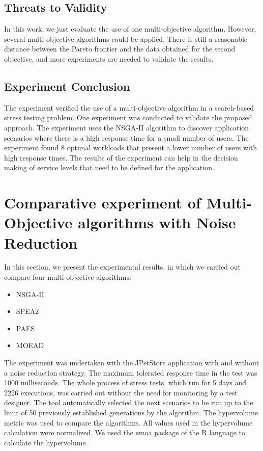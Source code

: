 \documentclass[espaco=umemeio,chapter=TITLE,twoside,openright]{abnt}
\begin{document}
\subsection{Threats to Validity}

In this work, we just evaluate the use of one multi-objective algorithm. However, several multi-objective algorithms could be applied.  There is still a reasonable distance between the Pareto frontier and the data obtained for the second objective, and more experiments are needed to validate the results.

\subsection{Experiment Conclusion}


The experiment verified the use of a multi-objective algorithm in a search-based stress testing problem. One experiment was conducted to validate the proposed approach. The experiment uses the NSGA-II algorithm to discover application scenarios where there is a high response time for a small number of users. The experiment found 8 optimal workloads that present a lower number of users with high response times. The results of the experiment can help in the decision making of service levels that need to be defined for the application.

\section{Comparative experiment of Multi-Objective algorithms with Noise Reduction}


In this section, we present the experimental results, in which we carried out compare four multi-objective algorithms:

\begin{itemize}
\item NSGA-II
\item SPEA2
\item PAES
\item MOEAD
\end{itemize}

The experiment was undertaken with the JPetStore application with and without a noise reduction strategy. The maximum tolerated response time in the test was 1000 milliseconds.  The whole process of stress tests, which run for 5 days and 2226 executions, was carried out without the need for monitoring by a test designer. The tool automatically selected the next scenarios to be run up to the limit of 50 previously established generations by the algorithm. The hypervolume metric was used to compare the algorithms.  All values used in the hypervolume calculation were normalized. We used the emoa package of the R language to calculate the hypervolume.
\end{document}

